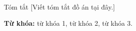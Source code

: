 \begin{preface}{Tóm tắt}
  [Viết tóm tắt đồ án tại đây.]

  \vspace{1em}
  \noindent\textbf{Từ khóa:} từ khóa 1, từ khóa 2, từ khóa 3.
\end{preface}
